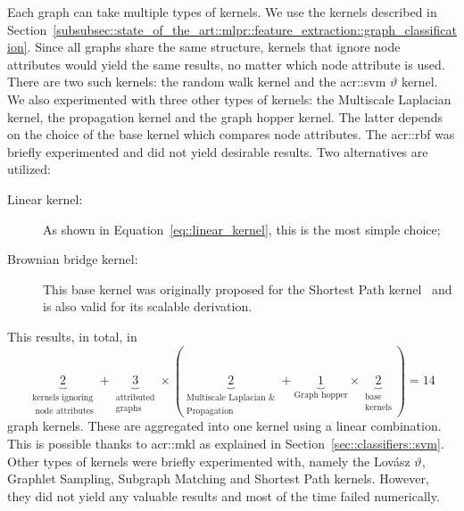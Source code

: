         Each graph can take multiple types of kernels.
        We use the kernels described in Section~\ref{subsubsec::state_of_the_art::mlpr::feature_extraction::graph_classification}.
        Since all graphs share the same structure, kernels that ignore node attributes would yield the same results, no matter which node attribute is used.
        There are two such kernels: the random walk kernel and the \gls{acr::svm} \(\vartheta\) kernel.
        We also experimented with three other types of kernels: the Multiscale Laplacian kernel, the propagation kernel and the graph hopper kernel.
        The latter depends on the choice of the base kernel which compares node attributes.
        The \gls{acr::rbf} was briefly experimented and did not yield desirable results.
        Two alternatives are utilized:
        \begin{description}
            \item[Linear kernel:] As shown in Equation~\ref{eq::linear_kernel}, this is the most simple choice;
            \item[Brownian bridge kernel:] This base kernel was originally proposed for the Shortest Path kernel~\parencite{borgwardt2005shortest} and is also valid for its scalable derivation.
        \end{description}
        This results, in total, in \begin{equation*}
            \underbrace{2}_{\substack{\text{kernels ignoring}\\\text{ node attributes}}} + \underbrace{3}_{\substack{\text{attributed}\\\text{graphs}}} \times \left(\underbrace{2}_{\substack{\text{Multiscale Laplacian \&}\\\text{Propagation}}} + \underbrace{1}_{\text{Graph hopper}} \times \underbrace{2}_{\substack{\text{base}\\\text{kernels}}}\right) = 14
        \end{equation*} graph kernels.
        These are aggregated into one kernel using a linear combination.
        This is possible thanks to \acrfull{acr::mkl} as explained in Section~\ref{sec::classifiers::svm}.
        Other types of kernels were briefly experimented with, namely the Lov\'asz \(\vartheta\), Graphlet Sampling, Subgraph Matching and Shortest Path kernels.
        However, they did not yield any valuable results and most of the time failed numerically.
        
